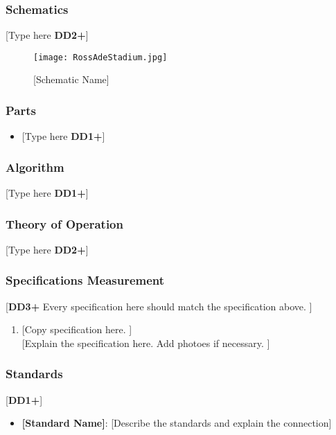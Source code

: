 \documentclass[letterpaper, 11pt]{article}
\begin{document}
\subsubsection{Schematics}
[Type here \textbf{DD2+}]
\begin{figure}[h]
    \centering
    \texttt{[image: RossAdeStadium.jpg]} %
    \caption{[Schematic Name]}
\end{figure} %

\subsubsection{Parts}
\begin{itemize}
    \item {[Type here \textbf{DD1+}]}
\end{itemize}

\subsubsection{Algorithm}
[Type here \textbf{DD1+}]

\subsubsection{Theory of Operation}
[Type here \textbf{DD2+}]

\subsubsection{Specifications Measurement}
[\textbf{DD3+} Every specification here should match the specification above. ]
\begin{enumerate}
    \item {[Copy specification here. ]} \\
    {[Explain the specification here. Add photoes if necessary. ]}
\end{enumerate}

\subsubsection{Standards}
[\textbf{DD1+}]
\begin{itemize}
    \item \textbf{[Standard Name]}: [Describe the standards and explain the connection]
\end{itemize}
\end{document}
